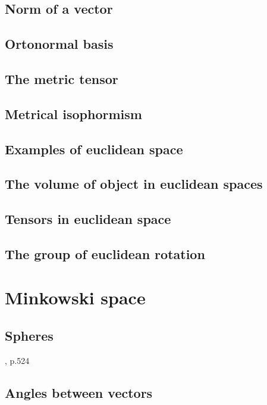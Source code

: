 \documentclass{book}
\begin{document}
\section{Norm of a vector}

\section{Ortonormal basis}

\section{The metric tensor}

\section{Metrical isophormism}

\section{Examples of euclidean space}

\section{The volume of object in euclidean spaces}

\section{Tensors in euclidean space}

\section{The group of euclidean rotation}

\chapter{Minkowski space}

\section{Spheres}

\cite{rosenfeld_noneucldean}, p.524

\section{Angles between vectors}
\end{document}
